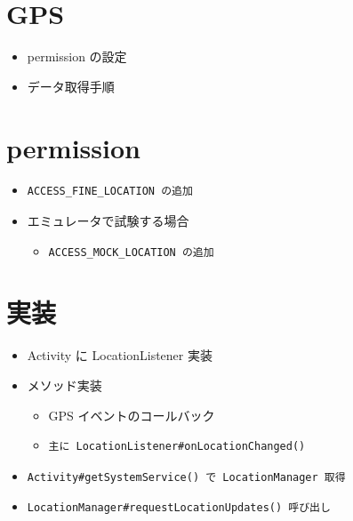 \documentclass[slide,papersize]{jsarticle}
\begin{document}
\section*{GPS}
\bigskip
\begin{itemize}
\item permission の設定
\bigskip
\item データ取得手順
\end{itemize}

\section*{permission}
\bigskip
\begin{itemize}
\item \begin{verbatim}ACCESS_FINE_LOCATION の追加\end{verbatim}
\bigskip
\item エミュレータで試験する場合
 \begin{itemize}
 \item \begin{verbatim}ACCESS_MOCK_LOCATION の追加\end{verbatim}
 \end{itemize}
\end{itemize}

\section*{実装}
\bigskip
\begin{itemize}
\item Activity に LocationListener 実装
\bigskip
\item メソッド実装
 \begin{itemize}
 \item {\scriptsize GPS イベントのコールバック}
 \item {\scriptsize \begin{verbatim}主に LocationListener#onLocationChanged()\end{verbatim}}
 \end{itemize}
\bigskip
\item {\scriptsize \begin{verbatim}Activity#getSystemService() で LocationManager 取得\end{verbatim}}
\bigskip
\item {\scriptsize \begin{verbatim}LocationManager#requestLocationUpdates() 呼び出し\end{verbatim}}
\end{itemize}
\end{document}
